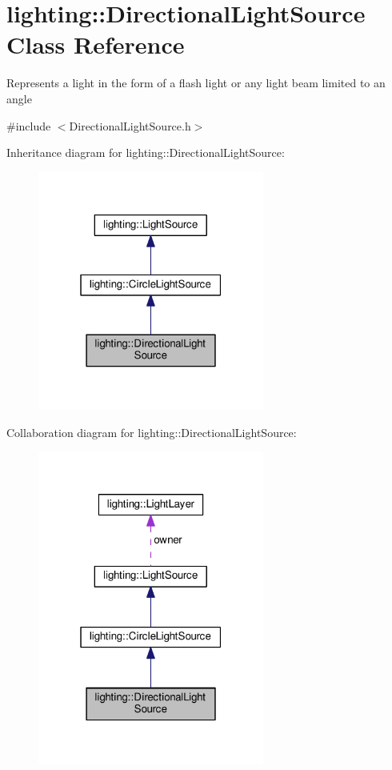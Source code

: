 \hypertarget{classlighting_1_1DirectionalLightSource}{}\section{lighting\+:\+:Directional\+Light\+Source Class Reference}
\label{classlighting_1_1DirectionalLightSource}


Represents a light in the form of a flash light or any light beam limited to an angle  




{\ttfamily \#include $<$Directional\+Light\+Source.\+h$>$}



Inheritance diagram for lighting\+:\+:Directional\+Light\+Source\+:\nopagebreak
\begin{figure}[H]
\begin{center}
\leavevmode
\includegraphics[width=211pt]{classlighting_1_1DirectionalLightSource__inherit__graph}
\end{center}
\end{figure}


Collaboration diagram for lighting\+:\+:Directional\+Light\+Source\+:\nopagebreak
\begin{figure}[H]
\begin{center}
\leavevmode
\includegraphics[width=211pt]{classlighting_1_1DirectionalLightSource__coll__graph}
\end{center}
\end{figure}

